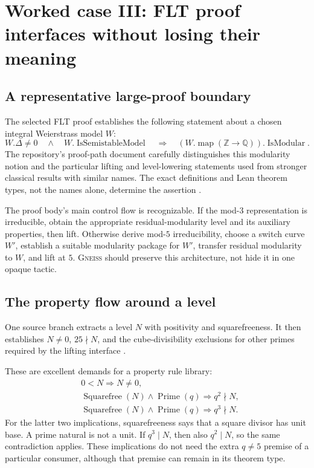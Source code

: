 \documentclass[11pt,letterpaper]{article}
\newcommand{\Gneiss}{\textsc{Gneiss}}
\newcommand{\Z}{\mathbb Z}
\newcommand{\Q}{\mathbb Q}
\theoremstyle{definition}
\theoremstyle{remark}
\begin{document}
\section{Worked case III: FLT proof interfaces without losing their meaning}\label{sec:flt}

\subsection{A representative large-proof boundary}
The selected FLT proof establishes the following statement about a chosen
integral Weierstrass model $W$:
\[
 W.\Delta\ne0\quad\wedge\quad W.\operatorname{IsSemistableModel}
 \quad\Longrightarrow\quad
 (W.\operatorname{map}(\Z\to\Q)).\operatorname{IsModular}.
\]
The repository's proof-path document carefully distinguishes this modularity
notion and the particular lifting and level-lowering statements used from
stronger classical results with similar names. The exact definitions and
Lean theorem types, not the names alone, determine the assertion
\cite{flt-path,flt-modularity}.

The proof body's main control flow is recognizable. If the mod-$3$
representation is irreducible, obtain the appropriate residual-modularity
level and its auxiliary properties, then lift. Otherwise derive mod-$5$
irreducibility, choose a switch curve $W'$, establish a suitable modularity
package for $W'$, transfer residual modularity to $W$, and lift at $5$.
\Gneiss{} should preserve this architecture, not hide it in one opaque tactic.

\subsection{The property flow around a level}
One source branch extracts a level $N$ with positivity and squarefreeness. It
then establishes $N\ne0$, $25\nmid N$, and the cube-divisibility exclusions for
other primes required by the lifting interface \cite{flt-modularity}.

These are excellent demands for a property rule library:
\[
\begin{aligned}
  &0<N\Longrightarrow N\ne0,\\
  &\operatorname{Squarefree}(N)\wedge\operatorname{Prime}(q)
       \Longrightarrow q^2\nmid N,\\
  &\operatorname{Squarefree}(N)\wedge\operatorname{Prime}(q)
       \Longrightarrow q^3\nmid N.
\end{aligned}
\]
For the latter two implications, squarefreeness says that a square divisor has
unit base. A prime natural is not a unit. If $q^3\mid N$, then also $q^2\mid N$,
so the same contradiction applies. These implications do not need the extra
$q\ne5$ premise of a particular consumer, although that premise can remain in
its theorem type.
\end{document}

